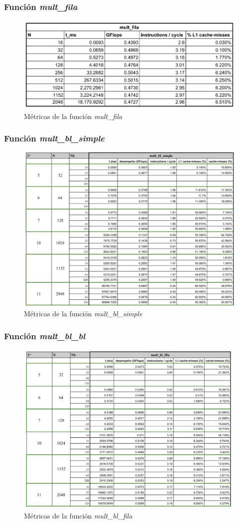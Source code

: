 \documentclass[11pt]{article}
\begin{document}
\subsubsection*{Función \emph{mult\_fila}}
\begin{figure}[h]
    \centering
    \includegraphics[width=.7\textwidth]{t_mul_fila.pdf}
    \caption{Métricas de la función \emph{mult\_fila}}
    \label{Fig:Ej2:mult_fila}
\end{figure}
\newpage
\subsubsection*{Función \emph{mult\_bl\_simple}}
\begin{figure}[h]
    \centering
    \includegraphics[width=.95\textwidth]{t_mul_bl_simple.pdf}
    \caption{Métricas de la función \emph{mult\_bl\_simple}}
    \label{Fig:Ej2:mult_bl_simple}
\end{figure}
\newpage
\subsubsection*{Función \emph{mult\_bl\_bl}}
\begin{figure}[h]
    \centering
    \includegraphics[width=.95\textwidth]{t_mul_bl_fila.pdf}
    \caption{Métricas de la función \emph{mult\_bl\_fila}}
   \label{Fig:Ej2:mult_bl_fila}
\end{figure}
\end{document}
